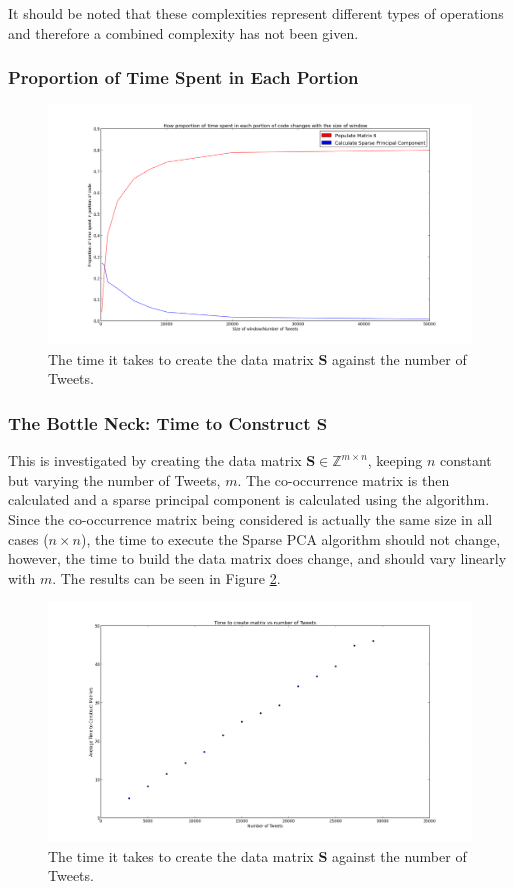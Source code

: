 \documentclass[11pt,a4paper]{article}
\newcommand{\inintmxn}{\in \mathbb{Z}^{m\times n}}
\newcommand{\smat}{\mathbf{S}}
\begin{document}
It should be noted that these complexities represent different types of operations and therefore a combined complexity has not been given. 
\subsubsection{Proportion of Time Spent in Each Portion}
\begin{figure}[H]
\centering
\includegraphics[scale=0.30]{proportion_time.png}
\caption{The time it takes to create the data matrix $\smat$ against the number of Tweets.}
\label{time_matrix_construction}
\end{figure}
\subsubsection{The Bottle Neck: Time to Construct $\smat$}


This is investigated by creating the data matrix $\smat \inintmxn$, keeping $n$ constant but varying the number of Tweets, $m$. The co-occurrence matrix is then calculated and a sparse principal component is calculated using the algorithm. Since the co-occurrence matrix being considered is actually the same size in all cases ($n \times n$), the time to execute the Sparse PCA algorithm should not change, however, the time to build the data matrix does change, and should vary linearly with $m$. The results can be seen in Figure \ref{time_matrix_construction}.

\begin{figure}[H]
\centering
\includegraphics[scale=0.30]{Time_Matrix_Construction.png}
\caption{The time it takes to create the data matrix $\smat$ against the number of Tweets.}
\label{time_matrix_construction}
\end{figure}
\end{document}
